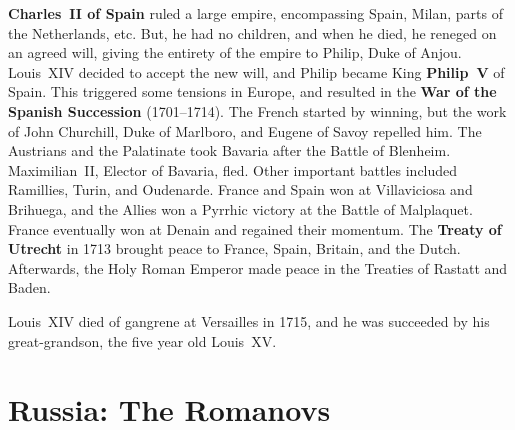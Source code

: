 \textbf{Charles~II of Spain} ruled a large empire, encompassing Spain, Milan, parts of the Netherlands, etc.
But, he had no children, and when he died, he reneged on an agreed will,
giving the entirety of the empire to Philip, Duke of Anjou.
Louis~XIV decided to accept the new will, and Philip became King \textbf{Philip~V} of Spain.
This triggered some tensions in Europe, and resulted in the \textbf{War of the Spanish Succession} (1701--1714).
The French started by winning, but the work of John Churchill, Duke of Marlboro, and Eugene of Savoy repelled him.
The Austrians and the Palatinate took Bavaria after the Battle of Blenheim.
Maximilian~II, Elector of Bavaria, fled.
Other important battles included Ramillies, Turin, and Oudenarde.
France and Spain won at Villaviciosa and Brihuega,
and the Allies won a Pyrrhic victory at the Battle of Malplaquet.
France eventually won at Denain and regained their momentum.
The \textbf{Treaty of Utrecht} in 1713 brought peace to France, Spain, Britain, and the Dutch.
Afterwards, the Holy Roman Emperor made peace in the Treaties of Rastatt and Baden.

Louis~XIV died of gangrene at Versailles in 1715,
and he was succeeded by his great-grandson, the five year old Louis~XV\@.

\section{Russia: The Romanovs}

